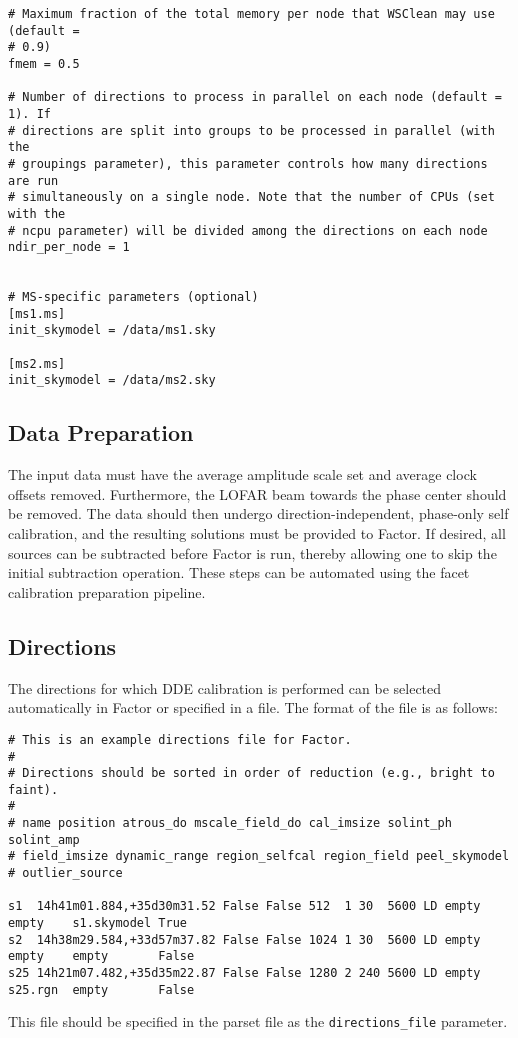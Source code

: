 \documentclass[structabstract]{article}
\begin{document}
\begin{verbatim}
# Maximum fraction of the total memory per node that WSClean may use (default =
# 0.9)
fmem = 0.5

# Number of directions to process in parallel on each node (default = 1). If
# directions are split into groups to be processed in parallel (with the
# groupings parameter), this parameter controls how many directions are run
# simultaneously on a single node. Note that the number of CPUs (set with the
# ncpu parameter) will be divided among the directions on each node
ndir_per_node = 1


# MS-specific parameters (optional)
[ms1.ms]
init_skymodel = /data/ms1.sky

[ms2.ms]
init_skymodel = /data/ms2.sky
\end{verbatim}


\subsection{Data Preparation}
\label{factor:data}

The input data must have the average amplitude scale set and average clock
offsets removed. Furthermore, the LOFAR beam towards the phase center should be
removed. The data should then undergo direction-independent, phase-only self
calibration, and the resulting solutions must be provided to Factor. If desired,
all sources can be subtracted before Factor is run, thereby allowing one to skip
the initial subtraction operation. These steps can be automated using the facet
calibration preparation pipeline.

\subsection{Directions}
\label{factor:directions}

The directions for which DDE calibration is performed can be selected
automatically in Factor or specified in a file. The format of the file is as
follows:

\begin{verbatim}
# This is an example directions file for Factor.
#
# Directions should be sorted in order of reduction (e.g., bright to faint).
#
# name position atrous_do mscale_field_do cal_imsize solint_ph solint_amp
# field_imsize dynamic_range region_selfcal region_field peel_skymodel
# outlier_source

s1  14h41m01.884,+35d30m31.52 False False 512  1 30  5600 LD empty empty    s1.skymodel True
s2  14h38m29.584,+33d57m37.82 False False 1024 1 30  5600 LD empty empty    empty       False
s25 14h21m07.482,+35d35m22.87 False False 1280 2 240 5600 LD empty s25.rgn  empty       False
\end{verbatim}
This file should be specified in the parset file as the {\tt directions\_file}
parameter.
\end{document}
